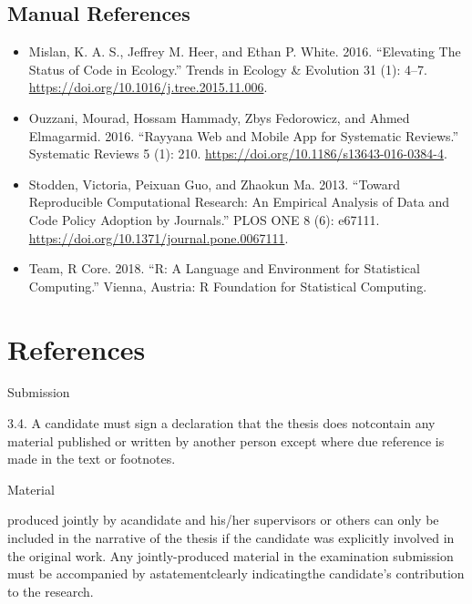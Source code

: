 \hypertarget{manual-references}{%
\section{Manual References}\label{manual-references}}
\begin{itemize}
\item
  Mislan, K. A. S., Jeffrey M. Heer, and Ethan P. White. 2016. ``Elevating The Status of Code in Ecology.'' Trends in Ecology \& Evolution 31 (1): 4--7. \url{https://doi.org/10.1016/j.tree.2015.11.006}.
\item
  Ouzzani, Mourad, Hossam Hammady, Zbys Fedorowicz, and Ahmed Elmagarmid. 2016. ``Rayyana Web and Mobile App for Systematic Reviews.'' Systematic Reviews 5 (1): 210. \url{https://doi.org/10.1186/s13643-016-0384-4}.
\item
  Stodden, Victoria, Peixuan Guo, and Zhaokun Ma. 2013. ``Toward Reproducible Computational Research: An Empirical Analysis of Data and Code Policy Adoption by Journals.'' PLOS ONE 8 (6): e67111. \url{https://doi.org/10.1371/journal.pone.0067111}.
\item
  Team, R Core. 2018. ``R: A Language and Environment for Statistical Computing.'' Vienna, Austria: R Foundation for Statistical Computing.
\end{itemize}
\backmatter

\hypertarget{references}{%
\chapter*{References}\label{references}}


\noindent

\setlength{\parindent}{-0.20in}

Submission

3.4. A candidate must sign a declaration that the thesis does notcontain any material published or
written by another person except where due reference is made in the text or footnotes.

Material

produced jointly by acandidate and his/her supervisors or others can only be included in the narrative of
the thesis if the candidate was explicitly involved in the original work. Any jointly-produced material in
the examination submission must be accompanied by astatementclearly indicatingthe candidate's
contribution to the research.


